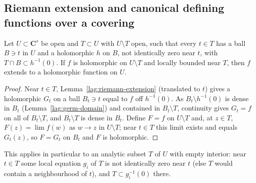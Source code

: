 \subsection{Riemann extension and canonical defining functions over a covering}

\begin{lemma}
\label{rem:riemann-extension-thin}
\leanok
Let \(U\subset\mathbf C^s\) be open and \(T\subset U\) with \(U\setminus T\) open, such that every \(t\in T\) has a ball \(B\ni t\) in \(U\) and a holomorphic \(h\) on
\(B\), not identically zero near \(t\), with \(T\cap B\subset h^{-1}(0)\). If \(f\) is holomorphic on \(U\setminus T\) and locally bounded near \(T\), then \(f\) extends to a
holomorphic function on \(U\).
\end{lemma}
\begin{proof}
\leanok
Near \(t\in T\), Lemma~\ref{lag:riemann-extension} (translated to \(t\)) gives a holomorphic \(G_t\) on a ball \(B_t\ni t\) equal to \(f\) off \(h^{-1}(0)\). As
\(B_t\setminus h^{-1}(0)\) is dense in \(B_t\) (Lemma~\ref{lag:germ-domain}) and contained in \(B_t\setminus T\), continuity gives \(G_t=f\) on all of \(B_t\setminus T\), and
\(B_t\setminus T\) is dense in \(B_t\). Define \(F=f\) on \(U\setminus T\) and, at \(z\in T\), \(F(z)=\lim f(w)\) as \(w\to z\) in \(U\setminus T\); near \(t\in T\) this limit
exists and equals \(G_t(z)\), so \(F=G_t\) on \(B_t\) and \(F\) is holomorphic.
\end{proof}
This applies in particular to an analytic subset \(T\) of \(U\) with empty interior: near \(t\in T\) some local equation \(g_i\) of \(T\) is not identically zero near
\(t\) (else \(T\) would contain a neighbourhood of \(t\)), and \(T\subset g_i^{-1}(0)\) there.

